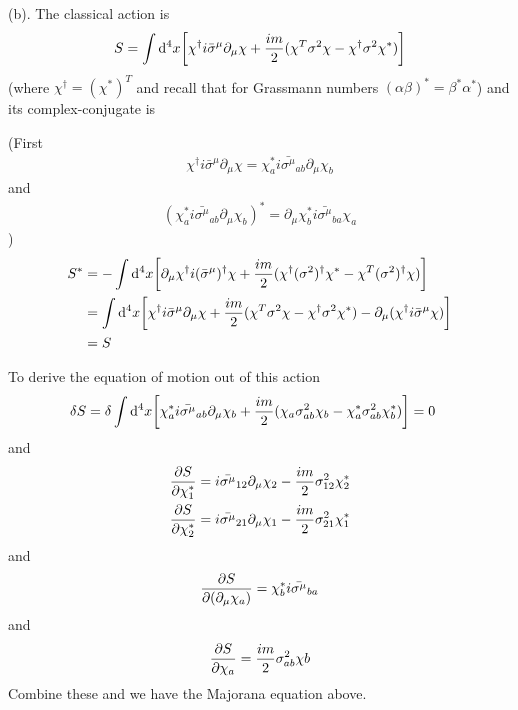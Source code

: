 \documentclass{article}
\begin{document}
(b). The classical action is
\begin{align}
  S=\int\dd^4x\bqty{\chi^{\dagger}i\bar{\sigma}^{\mu}\partial_{\mu}\chi+\frac{im}{2}(\chi^T\sigma^2\chi-\chi^{\dagger}\sigma^2\chi^*)}
\end{align}
(where $\chi^{\dagger}=(\chi^*)^T$ and recall that for Grassmann numbers $(\alpha\beta)^*=\beta^*\alpha^*$) and its complex-conjugate is

(First
\begin{align*}
  \chi^{\dagger}i\bar{\sigma}^{\mu}\partial_{\mu}\chi=\chi^*_ai\bar{\sigma^{\mu}}_{ab}\partial_{\mu}\chi_b
\end{align*}
and
\begin{align*}
  (\chi^*_ai\bar{\sigma^{\mu}}_{ab}\partial_{\mu}\chi_b)^*=\partial_{\mu}\chi_b^*i\bar{\sigma^{\mu}}_{ba}\chi_a
\end{align*}
)
\begin{align*}
  S^*&=-\int\dd^4x\bqty{\partial_{\mu}\chi^{\dagger}i(\bar{\sigma}^{\mu})^{\dagger}\chi+\frac{im}{2}(\chi^{\dagger}(\sigma^2)^{\dagger}\chi^*-\chi^T(\sigma^2)^{\dagger}\chi)}\\
  &=\int\dd^4x\bqty{\chi^{\dagger}i\bar{\sigma}^{\mu}\partial_{\mu}\chi+\frac{im}{2}(\chi^T\sigma^2\chi-\chi^{\dagger}\sigma^2\chi^*)-\partial_{\mu}(\chi^{\dagger}i\bar{\sigma}^{\mu}\chi)}\\
  &=S
\end{align*}

To derive the equation of motion out of this action
\begin{align*}
  \delta S&=\delta\int\dd^4x\bqty{\chi^*_ai\bar{\sigma^{\mu}}_{ab}\partial_{\mu}\chi_b+\frac{im}{2}(\chi_a\sigma^2_{ab}\chi_b-\chi^*_a\sigma^2_{ab}\chi^*_b)}=0
\end{align*}
and
\begin{align*}
  \pdv{S}{\chi_1^*}=i\bar{\sigma^{\mu}}_{12}\partial_{\mu}\chi_2-\frac{im}{2}\sigma^2_{12}\chi_2^*\\
  \pdv{S}{\chi_2^*}=i\bar{\sigma^{\mu}}_{21}\partial_{\mu}\chi_1-\frac{im}{2}\sigma^2_{21}\chi_1^*
\end{align*}
and
\begin{align*}
  \pdv{S}{(\partial_{\mu}\chi_a)}=\chi^*_bi\bar{\sigma^{\mu}}_{ba}
\end{align*}
and
\begin{align*}
  \pdv{S}{\chi_a}=\frac{im}{2}\sigma^2_{ab}\chi{b}
\end{align*}
Combine these and we have the Majorana equation above.
\end{document}
